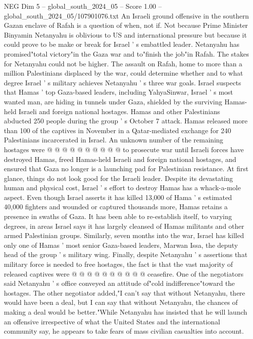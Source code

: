 \begin{textsample}{NEG Dim 5 – global\_south\_2024\_05 – Score 1.00 – global\_south\_2024\_05/107901076.txt}  \label{ex:f5_neg_324}
An Israeli ground offensive in the southern Gazan enclave of Rafah is a question of when, not if.
Not because Prime Minister Binyamin Netanyahu is oblivious to US and international pressure but because it could prove to be make or break for Israel ' s embattled leader.
Netanyahu has promised"total victory"in the Gaza war and to"finish the job"in Rafah.
The stakes for Netanyahu could not be higher.
The assault on Rafah, home to more than a million Palestinians displaced by the war, could determine whether and to what degree Israel ' s military achieves Netanyahu ' s three war goals.
Israel suspects that Hamas ' top Gaza-based leaders, including YahyaSinwar, Israel ' s most wanted man, are hiding in tunnels under Gaza, shielded by the surviving Hamas-held Israeli and foreign national hostages.
Hamas and other Palestinians abducted 250 people during the group ' s October 7 attack.
Hamas released more than 100 of the captives in November in a Qatar-mediated exchange for 240 Palestinians incarcerated in Israel.
An unknown number of the remaining hostages were @ @ @ @ @ @ @ @ @ @ to prosecute war until Israeli forces have destroyed Hamas, freed Hamas-held Israeli and foreign national hostages, and ensured that Gaza no longer is a launching pad for Palestinian resistance.
At first glance, things do not look good for the Israeli leader.
Despite its devastating human and physical cost, Israel ' s effort to destroy Hamas has a whack-a-mole aspect.
Even though Israel asserts it has killed 13,000 of Hama ' s estimated 40,000 fighters and wounded or captured thousands more, Hamas retains a presence in swaths of Gaza.
It has been able to re-establish itself, to varying degrees, in areas Israel says it has largely cleansed of Hamas militants and other armed Palestinian groups.
Similarly, seven months into the war, Israel has killed only one of Hamas ' most senior Gaza-based leaders, Marwan Issa, the deputy head of the group ' s military wing.
Finally, despite Netanyahu ' s assertions that military force is needed to free hostages, the fact is that the vast majority of released captives were @ @ @ @ @ @ @ @ @ @ ceasefire.
One of the negotiators said Netanyahu ' s office conveyed an attitude of"cold indifference"toward the hostages.
The other negotiator added,"I can't say that without Netanyahu, there would have been a deal, but I can say that without Netanyahu, the chances of making a deal would be better."While Netanyahu has insisted that he will launch an offensive irrespective of what the United States and the international community say, he appears to take fears of mass civilian casualties into account.

\end{textsample}

